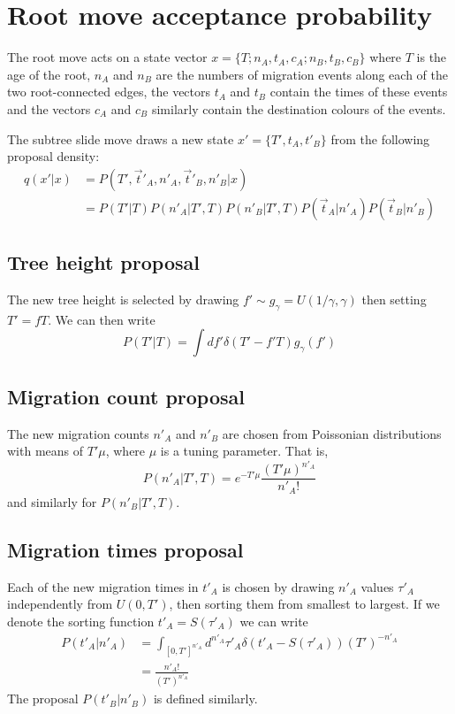 \documentclass[a4paper, 11pt]{article}
\begin{document}
\section{Root move acceptance probability}

The root move acts on a state vector $x=\{T;n_A,t_A,c_A;n_B,t_B,c_B\}$
where $T$ is the age of the root, $n_A$ and $n_B$ are the numbers of
migration events along each of the two root-connected edges, the
vectors $t_A$ and $t_B$ contain the times of these events and the
vectors $c_A$ and $c_B$ similarly contain the destination colours of
the events.

The subtree slide move draws a new state $x'=\{T',t_A,t'_B\}$
from the following proposal density:
\begin{align}
  q(x'|x) &= P(T',\vec{t}'_A,n'_A,\vec{t}'_B,n'_B|x) \nonumber \\
& = P(T'|T)P(n'_A|T',T)P(n'_B|T',T)P(\vec{t}_A|n'_A)P(\vec{t}_B|n'_B)
\end{align}

\subsection{Tree height proposal}

The new tree height is selected by drawing $f'\sim g_\gamma=U(1/\gamma,\gamma)$
then setting $T'=fT$. We can then write
\begin{equation}
  P(T'|T)=\int df'\delta(T'-f'T)g_\gamma(f')
\end{equation}

\subsection{Migration count proposal}

The new migration counts $n'_A$ and $n'_B$ are chosen from Poissonian
distributions with means of $T'\mu$, where $\mu$ is a tuning
parameter.  That is,
\begin{equation}
  P(n'_A|T',T)=e^{-T'\mu}\frac{(T'\mu)^{n'_A}}{n'_A!}
\end{equation}
and similarly for $P(n'_B|T',T)$.

\subsection{Migration times proposal}

Each of the new migration times in $t'_A$ is chosen by drawing $n'_A$
values $\tau'_A$ independently from $U(0,T')$, then sorting them from smallest
to largest.  If we denote the sorting function $t'_A=S(\tau'_A)$ we
can write
\begin{align}
  P(t'_A|n'_A) &= \int_{[0,T']^{n'_A}}
  d^{n'_A}\tau'_A\delta(t'_A-S(\tau'_A))(T')^{-n'_A}\nonumber\\
&= \frac{n'_A!}{(T')^{n'_A}}
\end{align}
The proposal $P(t'_B|n'_B)$ is defined similarly.
\end{document}
